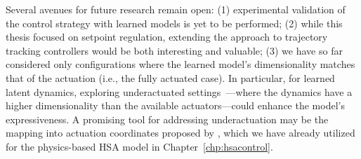 Several avenues for future research remain open: (1) experimental validation of the control strategy with learned models is yet to be performed; (2) while this thesis focused on setpoint regulation, extending the approach to trajectory tracking controllers would be both interesting and valuable; (3) we have so far considered only configurations where the learned model’s dimensionality matches that of the actuation (i.e., the fully actuated case). In particular, for learned latent dynamics, exploring underactuated settings~\citep{della2023model}—where the dynamics have a higher dimensionality than the available actuators—could enhance the model’s expressiveness. A promising tool for addressing underactuation may be the mapping into actuation coordinates proposed by \citet{pustina2024input}, which we have already utilized for the physics-based \gls{HSA} model in Chapter~\ref{chp:hsacontrol}.

